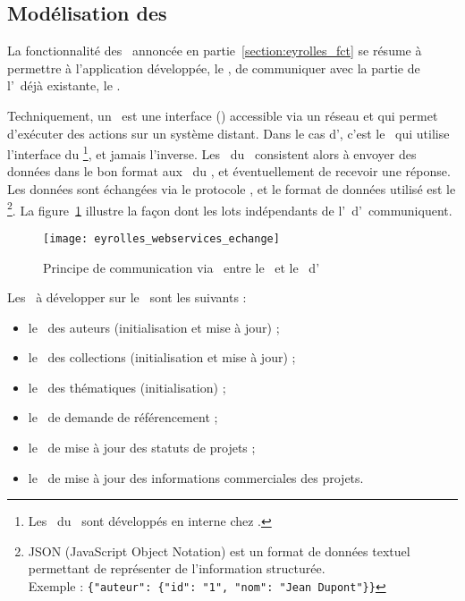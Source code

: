 \subsection{Modélisation des \awss}

La fonctionnalité des \awss\ annoncée en partie~\ref{section:eyrolles_fct} se résume à permettre à l'application développée, le \alotdeux, de communiquer avec la partie de l'\aintranet\ déjà existante, le \alotun.

Techniquement, un \aws\ est une interface (\aapi) accessible via un réseau et qui permet d'exécuter des actions sur un système distant. Dans le cas d'\aey, c'est le \alotdeux\ qui utilise l'interface du \alotun\footnote{Les \awss\ du \alotun\ sont développés en interne chez \aey.}, et jamais l'inverse. Les \awss\ du \alotdeux\ consistent alors à envoyer des données dans le bon format aux \awss\ du \alotun, et éventuellement de recevoir une réponse. Les données sont échangées via le protocole \ahttp, et le format de données utilisé est le \ajson\footnote{JSON (JavaScript Object Notation) est un format de données textuel permettant de représenter de l'information structurée.\\Exemple : \texttt{\{"auteur": \{"id": "1", "nom": "Jean Dupont"\}\}}}. La figure~\ref{figure:eyrolles_webservices_echange} illustre la façon dont les lots indépendants de l'\aintranet\ d'\aey\ communiquent.

\begin{figure}
	\centering
	\texttt{[image: eyrolles\_webservices\_echange]}
	\caption{Principe de communication via \aws\ entre le \alotun\ et le \alotdeux\ d'\aey}
	\label{figure:eyrolles_webservices_echange}
\end{figure}

Les \awss\ à développer sur le \alotdeux\ sont les suivants :

\begin{itemize}
	\item le \aws\ des auteurs (initialisation et mise à jour) ;
	\item le \aws\ des collections (initialisation et mise à jour) ;
	\item le \aws\ des thématiques (initialisation) ;
	\item le \aws\ de demande de référencement ;
	\item le \aws\ de mise à jour des statuts de projets ;
	\item le \aws\ de mise à jour des informations commerciales des projets.
\end{itemize}

